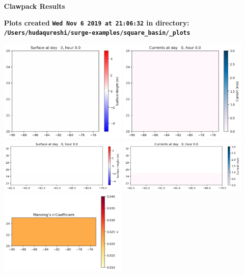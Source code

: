 \documentclass[11pt]{article}
\begin{document}
        \begin{center}{\Large\bf Clawpack Results}\vskip 5pt
        
        \bf Plots created {\tt Wed Nov  6 2019 at 21:06:32} in directory: \vskip 5pt
        \verb+/Users/hudaqureshi/surge-examples/square_basin/_plots+
        \end{center}
        \vskip 5pt
        \includegraphics[width=0.475\textwidth]{frame0000fig1001.png}
\includegraphics[width=0.475\textwidth]{frame0000fig1002.png}
\vskip 10pt 
\includegraphics[width=0.475\textwidth]{frame0000fig1003.png}
\includegraphics[width=0.475\textwidth]{frame0000fig1004.png}
\vskip 10pt 
\includegraphics[width=0.475\textwidth]{frame0000fig1005.png}
\end{document}
